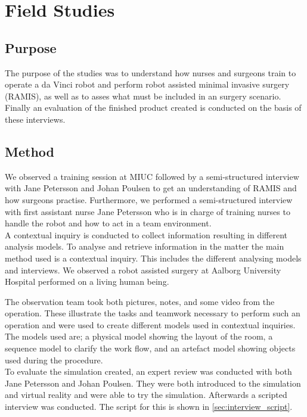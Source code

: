 \chapter*{Field Studies}
\section*{Purpose}
The purpose of the studies was to understand how nurses and surgeons train to operate a da Vinci robot and perform robot assisted minimal invasive surgery (RAMIS), as well as to asses what must be included in an surgery scenario.  Finally an evaluation of the finished product created is conducted on the basis of these interviews. 

\section*{Method}
We observed a training session at MIUC followed by a semi-structured interview with Jane Petersson and Johan Poulsen to get an understanding of RAMIS and how surgeons practise. Furthermore, we performed a semi-structured interview with first assistant nurse Jane Petersson who is in charge of training nurses to handle the robot and how to act in a team environment.\\

A contextual inquiry is conducted to collect information resulting in different analysis models.
To analyse and retrieve information in the matter the main method used is a contextual inquiry. This includes the different analysing models and interviews. We observed a robot assisted surgery at Aalborg University Hospital performed on a living human being.

The observation team took both pictures, notes, and some video from the operation. These illustrate the tasks and teamwork necessary to perform such an operation and were used to create different models used in contextual inquiries. The models used are; a physical model showing the layout of the room, a sequence model to clarify the work flow, and an artefact model showing objects used during the procedure.\\

To evaluate the simulation created, an expert review was conducted with both Jane Petersson and Johan Poulsen.  They were both introduced to the simulation and virtual reality and were able to try the simulation. Afterwards a scripted interview was conducted. The script for this is shown in \autoref{sec:interview_script}.

